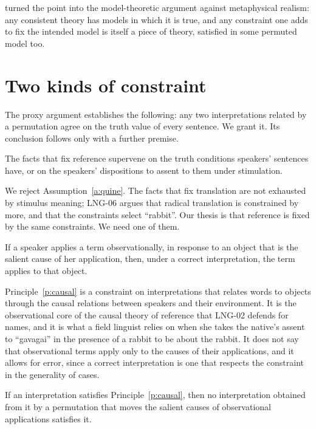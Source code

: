 \documentclass{situationist-preprint}
\begin{document}
\citet{Putnam1980,Putnam1981} turned the point into the model-theoretic argument against metaphysical realism: any consistent theory has models in which it is true, and any constraint one adds to fix the intended model is itself a piece of theory, satisfied in some permuted model too.

\section{Two kinds of constraint}

The proxy argument establishes the following: any two interpretations related by a permutation agree on the truth value of every sentence. We grant it. Its conclusion follows only with a further premise.

\begin{assumption}\label{a:quine}
The facts that fix reference supervene on the truth conditions speakers' sentences have, or on the speakers' dispositions to assent to them under stimulation.
\end{assumption}

We reject Assumption~\ref{a:quine}. The facts that fix translation are not exhausted by stimulus meaning; LNG-06 argues that radical translation is constrained by more, and that the constraints select \enquote{rabbit}. Our thesis is that reference is fixed by the same constraints. We need one of them.

\begin{principle}\label{p:causal}
If a speaker applies a term observationally, in response to an object that is the salient cause of her application, then, under a correct interpretation, the term applies to that object.
\end{principle}

Principle~\ref{p:causal} is a constraint on interpretations that relates words to objects through the causal relations between speakers and their environment. It is the observational core of the causal theory of reference that LNG-02 defends for names, and it is what a field linguist relies on when she takes the native's assent to \enquote{gavagai} in the presence of a rabbit to be about the rabbit. It does not say that observational terms apply only to the causes of their applications, and it allows for error, since a correct interpretation is one that respects the constraint in the generality of cases.

\begin{proposition}\label{p:proxy}
If an interpretation satisfies Principle~\ref{p:causal}, then no interpretation obtained from it by a permutation that moves the salient causes of observational applications satisfies it.
\end{proposition}
\end{document}
